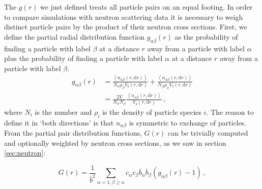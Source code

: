 The $g(r)$ we just defined treats all particle pairs on an equal footing. In order to compare simulations with neutron scattering data it is necessary to weigh distinct particle pairs by the product of their neutron cross sections. First, we define the partial radial distribution function $g_{\alpha\beta}(r)$ as the probability of finding a particle with label $\beta$ at a distance $r$ away from a particle with label $\alpha$ plus the probability of finding a particle with label $\alpha$ at a distance $r$ away from a particle with label $\beta$.
%
\begin{align*}
g_{\alpha\beta}(r) &= \frac{ \left\langle n_{\alpha\beta}(r,\mathrm{d}r) \right\rangle}{N_\alpha  \rho_\beta V_\text{s}(r,\mathrm{d}r)} + \frac{ \left\langle n_{\alpha\beta}(r,\mathrm{d}r) \right\rangle}{N_\beta \rho_\alpha V_\text{s}(r,\mathrm{d}r)} \\
&= \frac{2V}{N_\alpha N_\beta} \frac{ \left\langle n_{\alpha\beta}(r,\mathrm{d}r) \right\rangle}{V_\text{s}(r,\mathrm{d}r)} \, ,
\end{align*}
%
where $N_i$ is the number and $\rho_i$ is the density of particle species $i$. The reason to define it in `both directions' is that $n_{\alpha\beta}$ is symmetric to exchange of particles. From the partial pair distribution functions, $G(r)$ can be trivially computed and optionally weighted by neutron cross sections, as we saw in section \ref{sec:neutron}:

\[ G(r) = \frac{1}{\overline{b}^2} \sum_{\alpha=1,\beta\geq\alpha} c_\alpha c_\beta \overline{b}_\alpha \overline{b}_\beta (g_{\alpha\beta}(r) - 1) \, , \]

